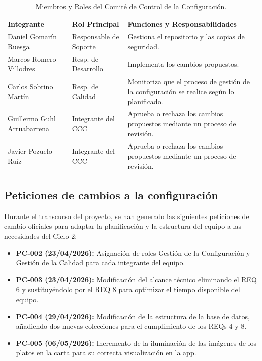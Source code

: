 \documentclass[11pt,a4paper]{article}
\begin{document}
\begin{table}[H]
\centering
\small
\begin{tabularx}{\textwidth}{@{}l l L@{}}
\toprule
\textbf{Integrante} & \textbf{Rol Principal} & \textbf{Funciones y Responsabilidades} \\ \midrule
Daniel Gomarín Ruesga & Responsable de Soporte & Gestiona el repositorio y las copias de seguridad. \\
Marcos Romero Villodres & Resp. de Desarrollo & Implementa los cambios propuestos. \\
Carlos Sobrino Martín & Resp. de Calidad & Monitoriza que el proceso de gestión de la configuración se realice según lo planificado. \\
Guillermo Guhl Arruabarrena & Integrante del CCC & Aprueba o rechaza los cambios propuestos mediante un proceso de revisión. \\
Javier Pozuelo Ruíz & Integrante del CCC & Aprueba o rechaza los cambios propuestos mediante un proceso de revisión. \\
\bottomrule
\end{tabularx}
\caption{Miembros y Roles del Comité de Control de la Configuración.}
\end{table}

\subsection{Peticiones de cambios a la configuración}

Durante el transcurso del proyecto, se han generado las siguientes peticiones de cambio oficiales para adaptar la planificación y la estructura del equipo a las necesidades del Ciclo 2:

\begin{itemize}
    \item \textbf{PC-002 (23/04/2026):} Asignación de roles Gestión de la Configuración y Gestión de la Calidad para cada integrante del equipo.
    \item \textbf{PC-003 (23/04/2026):} Modificación del alcance técnico eliminando el REQ 6 y sustituyéndolo por el REQ 8 para optimizar el tiempo disponible del equipo.
    \item \textbf{PC-004 (29/04/2026):} Modificación de la estructura de la base de datos, añadiendo dos nuevas colecciones para el cumplimiento de los REQs 4 y 8.
    \item \textbf{PC-005 (06/05/2026):} Incremento de la iluminación de las imágenes de los platos en la carta para su correcta visualización en la app.
\end{itemize}
\end{document}
